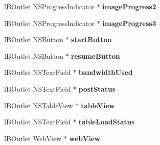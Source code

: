\begin{DoxyCompactItemize}
\item 
\hypertarget{interface_app_delegate_ae0d019ead5bf9eaf3322fc6d5eeac5de}{
\-I\-B\-Outlet \-N\-S\-Progress\-Indicator $\ast$ {\bfseries image\-Progress2}}
\label{interface_app_delegate_ae0d019ead5bf9eaf3322fc6d5eeac5de}

\item 
\hypertarget{interface_app_delegate_a685ce8fed035aecaf04fb8c0b62fa4fd}{
\-I\-B\-Outlet \-N\-S\-Progress\-Indicator $\ast$ {\bfseries image\-Progress3}}
\label{interface_app_delegate_a685ce8fed035aecaf04fb8c0b62fa4fd}

\item 
\hypertarget{interface_app_delegate_adce7a6216268ca7ba95de61dd39b6245}{
\-I\-B\-Outlet \-N\-S\-Button $\ast$ {\bfseries start\-Button}}
\label{interface_app_delegate_adce7a6216268ca7ba95de61dd39b6245}

\item 
\hypertarget{interface_app_delegate_a753f9689e16eaa4d543b301799aa259e}{
\-I\-B\-Outlet \-N\-S\-Button $\ast$ {\bfseries resume\-Button}}
\label{interface_app_delegate_a753f9689e16eaa4d543b301799aa259e}

\item 
\hypertarget{interface_app_delegate_a29d1fe73673bd64be43fc8af7d58d3fb}{
\-I\-B\-Outlet \-N\-S\-Text\-Field $\ast$ {\bfseries bandwidth\-Used}}
\label{interface_app_delegate_a29d1fe73673bd64be43fc8af7d58d3fb}

\item 
\hypertarget{interface_app_delegate_ad42ef9c691e3ef0822ed3010e2c7aa5a}{
\-I\-B\-Outlet \-N\-S\-Text\-Field $\ast$ {\bfseries post\-Status}}
\label{interface_app_delegate_ad42ef9c691e3ef0822ed3010e2c7aa5a}

\item 
\hypertarget{interface_app_delegate_a5699241f60abe31bb236da21be69353f}{
\-I\-B\-Outlet \-N\-S\-Table\-View $\ast$ {\bfseries table\-View}}
\label{interface_app_delegate_a5699241f60abe31bb236da21be69353f}

\item 
\hypertarget{interface_app_delegate_ac726a6261d83bf96aea4ad8126c8759e}{
\-I\-B\-Outlet \-N\-S\-Text\-Field $\ast$ {\bfseries table\-Load\-Status}}
\label{interface_app_delegate_ac726a6261d83bf96aea4ad8126c8759e}

\item 
\hypertarget{interface_app_delegate_afc49913089330a794448d9a8c28dc0a2}{
\-I\-B\-Outlet \-Web\-View $\ast$ {\bfseries web\-View}}
\label{interface_app_delegate_afc49913089330a794448d9a8c28dc0a2}


\end{DoxyCompactItemize}
